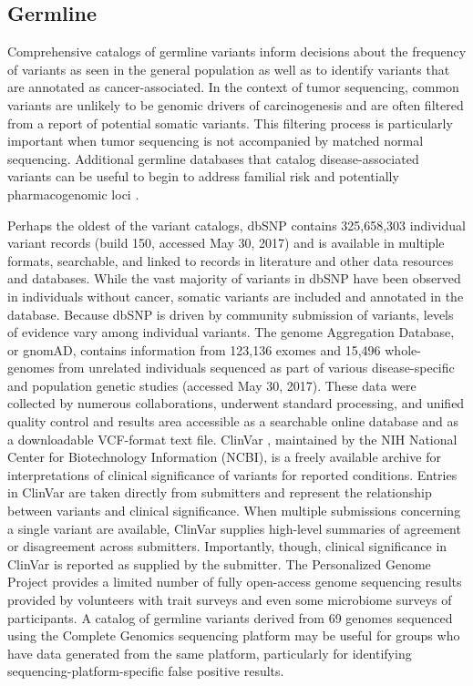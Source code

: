 \documentclass{article}
\begin{document}
\subsection{Germline}

Comprehensive catalogs of germline variants inform decisions
about the frequency of variants as seen in the general population as
well as to identify variants that are annotated as
cancer-associated. In the context of tumor sequencing, common variants
are unlikely to be genomic drivers of carcinogenesis and are often
filtered from a report of potential somatic variants. This filtering
process is particularly important when tumor sequencing is not
accompanied by matched normal sequencing. Additional germline
databases that catalog disease-associated variants can be useful to
begin to address familial risk and potentially pharmacogenomic loci
\parencite{Wheeler2013-dn,Relling2015-ie}.

Perhaps the oldest of the variant catalogs, dbSNP contains 325,658,303
individual variant records (build 150, accessed May 30, 2017) and is
available in multiple formats, searchable, and linked to records in
literature and other data resources and databases. While the vast
majority of variants in dbSNP have been observed in individuals
without cancer, somatic variants are included and annotated in the
database. Because dbSNP is driven by community submission of variants,
levels of evidence vary among individual variants. The genome
Aggregation Database, or gnomAD, \parencite{Lek2016-bb,noauthor_undated-of}
contains information from 123,136 exomes and 15,496 whole-genomes from
unrelated individuals sequenced as part of various disease-specific
and population genetic studies (accessed May 30, 2017). These data
were collected by numerous collaborations, underwent standard
processing, and unified quality control and results area accessible as
a searchable online database and as a downloadable VCF-format text
file. ClinVar \parencite{Landrum2016-ul}, maintained by the NIH National
Center for Biotechnology Information (NCBI), is a freely available
archive for interpretations of clinical significance of variants for
reported conditions. Entries in ClinVar are taken directly from
submitters and represent the relationship between variants and
clinical significance. When multiple submissions concerning a single
variant are available, ClinVar supplies high-level summaries of
agreement or disagreement across submitters. Importantly, though,
clinical significance in ClinVar is reported as supplied by the
submitter. The Personalized Genome Project \parencite{Church2005-lr}
provides a limited number of fully open-access genome sequencing
results provided by volunteers with trait surveys and even some
microbiome surveys of participants. A catalog of germline variants
derived from 69 genomes sequenced using the Complete Genomics
sequencing platform \parencite{Drmanac2010-od} may be useful for groups who
have data generated from the same platform, particularly for
identifying sequencing-platform-specific false positive results.
\end{document}
